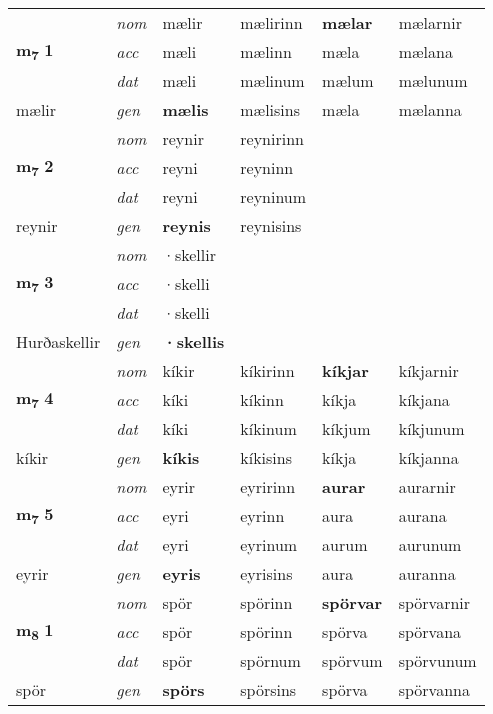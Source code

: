 \begin{longtable}[l]{X>{\footnotesize\itshape}XXXXX}
\multirow{3}{*}{{{\textbf{m{\textsubscript{7}}} \Large{\textbf{1}}}}}  
 & nom & mælir & mælirinn    & \textbf{mælar} & mælarnir  \\*
 & acc & mæli  & mælinn   & mæla  & mælana \\*
 & dat & mæli & mælinum   & mælum & mælunum \\*
 {\footnotesize{mælir}} &  gen & \textbf{mælis}  & mælisins  & mæla & mælanna \\
\cmidrule{1-6}


\multirow{3}{*}{{{\textbf{m{\textsubscript{7}}} \Large{\textbf{2}}}}}  
 & nom & reynir & reynirinn    & \textbf{} &   \\*
 & acc & reyni  & reyninn   &   &  \\*
 & dat & reyni & reyninum   &  &  \\*
 {\footnotesize{reynir}} &  gen & \textbf{reynis}  & reynisins  &  &  \\
\cmidrule{1-6}


\multirow{3}{*}{{{\textbf{m{\textsubscript{7}}} \Large{\textbf{3}}}}}  
 & nom & ·skellir &     & \textbf{} &   \\*
 & acc & ·skelli  &    &   &  \\*
 & dat & ·skelli &    &  &  \\*
 {\footnotesize{Hurðaskellir}} &  gen & \textbf{·skellis}  &   &  &  \\
\cmidrule{1-6}


\multirow{3}{*}{{{\textbf{m{\textsubscript{7}}} \Large{\textbf{4}}}}}  
 & nom & kíkir & kíkirinn    & \textbf{kíkjar} & kíkjarnir  \\*
 & acc & kíki  & kíkinn   & kíkja  & kíkjana \\*
 & dat & kíki & kíkinum   & kíkjum & kíkjunum \\*
 {\footnotesize{kíkir}} &  gen & \textbf{kíkis}  & kíkisins  & kíkja & kíkjanna \\
\cmidrule{1-6}


\multirow{3}{*}{{{\textbf{m{\textsubscript{7}}} \Large{\textbf{5}}}}}  
 & nom & eyrir & eyririnn    & \textbf{aurar} & aurarnir  \\*
 & acc & eyri  & eyrinn   & aura  & aurana \\*
 & dat & eyri & eyrinum   & aurum & aurunum \\*
 {\footnotesize{eyrir}} &  gen & \textbf{eyris}  & eyrisins  & aura & auranna \\
\cmidrule{1-6}


\multirow{3}{*}{{{\textbf{m{\textsubscript{8}}} \Large{\textbf{1}}}}}  
 & nom & spör & spörinn    & \textbf{spörvar} & spörvarnir  \\*
 & acc & spör  & spörinn   & spörva  & spörvana \\*
 & dat & spör & spörnum   & spörvum & spörvunum \\*
 {\footnotesize{spör}} &  gen & \textbf{spörs}  & spörsins  & spörva & spörvanna \\
\cmidrule{1-6}



\end{longtable}
